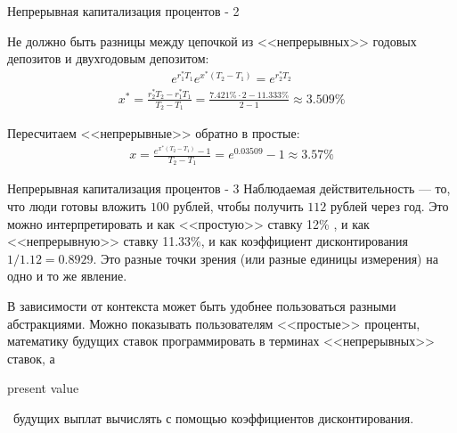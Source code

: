 \documentclass{beamer}
\newcommand{\en}[1]{\begin{otherlanguage}{english}#1\end{otherlanguage}}
\begin{document}
\begin{frame}{Непрерывная капитализация процентов - 2}
\centering
{}

\justifying
Не должно быть разницы между цепочкой из <<непрерывных>> годовых депозитов и двухгодовым депозитом:
\begin{align*}
e^{r_1^*T_1}e^{x^*(T_2-T_1)} = e^{r_2^*T_2}
\end{align*}
\begin{align*}
x^* = \frac{r_2^*T_2-r_1^*T_1}{T_2-T_1} = \frac{7.421\%\cdot2 - 11.333\%}{2 - 1} \approx 3.509\%
\end{align*}

Пересчитаем <<непрерывные>> обратно в простые:
\begin{align*}
x = \frac{e^{x^*(T_2-T_1)} - 1}{T_2 - T_1} = e^{0.03509} - 1 \approx 3.57\% 
\end{align*}
\end{frame}



\begin{frame}{Непрерывная капитализация процентов - 3}
\justify
Наблюдаемая действительность --- то, что люди готовы вложить $100$ рублей, чтобы получить $112$ рублей через год. Это можно интерпретировать и как <<простую>> ставку 12\% , и как <<непрерывную>> ставку 11.33\%, и как коэффициент дисконтирования $1/1.12 = 0.8929$. Это разные точки зрения (или разные единицы измерения) на одно и то же явление.

\justify 
В зависимости от контекста может быть удобнее пользоваться разными абстракциями. Можно показывать пользователям <<простые>> проценты, математику будущих ставок программировать в терминах <<непрерывных>> ставок, а \en{present value}\ будущих выплат вычислять с помощью коэффициентов дисконтирования.
\end{frame}
\end{document}
